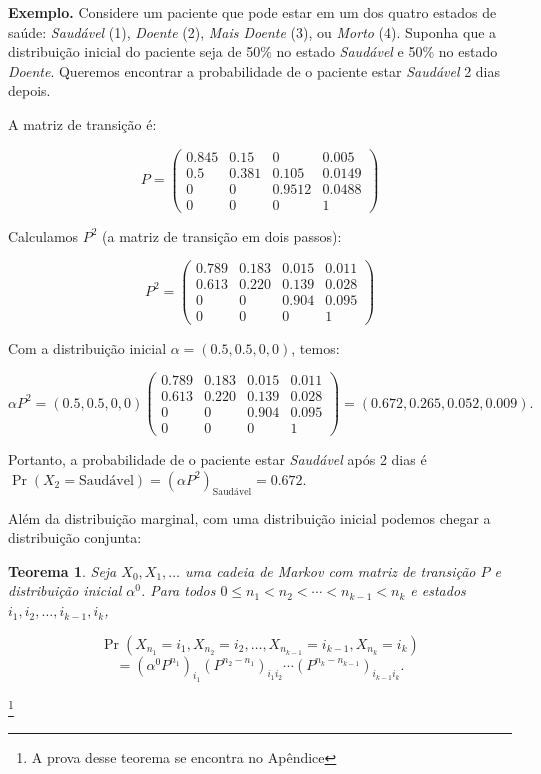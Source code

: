 \documentclass[12pt, a4paper, openany]{book}
\numberwithin{equation}{chapter}
\numberwithin{table}{chapter}
\numberwithin{figure}{chapter}
\theoremstyle{break}
\newtheorem{theorem}{Teorema}[section]
\begin{document}
\textbf{Exemplo.} Considere um paciente que pode estar em um dos quatro estados de saúde: \textit{Saudável} (1), \textit{Doente} (2), \textit{Mais Doente} (3), ou \textit{Morto} (4). Suponha que a distribuição inicial do paciente seja de 50\% no estado \textit{Saudável} e 50\% no estado \textit{Doente}. Queremos encontrar a probabilidade de o paciente estar \textit{Saudável} 2 dias depois.

A matriz de transição é:

\[
P = \begin{pmatrix}
    0.845 & 0.15 & 0 & 0.005 \\
    0.5 & 0.381 & 0.105 & 0.0149 \\
    0 & 0 & 0.9512 & 0.0488 \\
    0 & 0 & 0 & 1
\end{pmatrix}
\]

Calculamos \( P^2 \) (a matriz de transição em dois passos):

\[
P^2 = \begin{pmatrix}
    0.789 & 0.183 & 0.015 & 0.011 \\
    0.613 & 0.220 & 0.139 & 0.028 \\
    0 & 0 &0.904 & 0.095 \\
    0 & 0 & 0 & 1
\end{pmatrix}
\]

Com a distribuição inicial \( \alpha = (0.5, 0.5, 0, 0) \), temos:

\[
\alpha P^2 = (0.5, 0.5, 0, 0) \begin{pmatrix}
    0.789 & 0.183 & 0.015 & 0.011 \\
    0.613 & 0.220 & 0.139 & 0.028 \\
    0 & 0 &0.904 & 0.095 \\
    0 & 0 & 0 & 1
\end{pmatrix} = (0.672, 0.265, 0.052, 0.009).
\]

Portanto, a probabilidade de o paciente estar \textit{Saudável} após 2 dias é \( \Pr(X_2 = \text{Saudável}) = (\alpha P^2)_{\text{Saudável}} = 0.672 \).

Além da distribuição marginal, com uma distribuição inicial podemos chegar a distribuição conjunta:


\begin{theorem}
Seja \( X_0, X_1, \dots \) uma cadeia de Markov com matriz de transição \( P \) e distribuição inicial \( \alpha^0 \). Para todos \( 0 \leq n_1 < n_2 < \cdots < n_{k-1} < n_k \) e estados \( i_1, i_2, \dots, i_{k-1}, i_k \),

\[
\Pr(X_{n_1} = i_1, X_{n_2} = i_2, \dots, X_{n_{k-1}} = i_{k-1}, X_{n_k} = i_k)
\]
\[
= (\alpha^0 P^{n_1})_{i_1} (P^{n_2 - n_1})_{i_1 i_2} \cdots (P^{n_k - n_{k-1}})_{i_{k-1} i_k}.
\]

\end{theorem}\footnote{A prova desse teorema se encontra no Apêndice}
\end{document}
